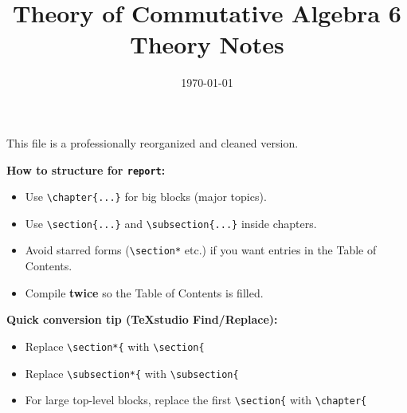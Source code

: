 \documentclass[12pt,a4paper,oneside]{report}
\title{\bfseries Theory of Commutative Algebra 6\\[0.5em]\Large Theory Notes}
\author{}
\date{\today}
\theoremstyle{notespace}
\begin{document}
\maketitle
\thispagestyle{plain}

\begin{center}
  \begin{minipage}{0.92\textwidth}
    This file is a professionally reorganized and cleaned version.
    \medskip

    \textbf{How to structure for \texttt{report}:}
    \begin{itemize}
      \item Use \verb|\chapter{...}| for big blocks (major topics).
      \item Use \verb|\section{...}| and \verb|\subsection{...}| inside chapters.
      \item Avoid starred forms (\verb|\section*| etc.) if you want entries in the Table of Contents.
      \item Compile \textbf{twice} so the Table of Contents is filled.
    \end{itemize}

    \textbf{Quick conversion tip (TeXstudio Find/Replace):}
    \begin{itemize}
      \item Replace \verb|\section*{| with \verb|\section{|
      \item Replace \verb|\subsection*{| with \verb|\subsection{|
      \item For large top-level blocks, replace the first \verb|\section{| with \verb|\chapter{|
    \end{itemize}


\end{minipage}
\end{center}
\end{document}

